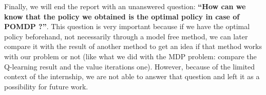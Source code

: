 \documentclass[
  a4paper, xcolor = usenames,dvipsnames]{article}
\theoremstyle{definition}
\theoremstyle{definition}
\theoremstyle{definition}
\theoremstyle{definition}
\theoremstyle{remark}
\begin{document}
Finally, we will end the report with an unanswered question: \textbf{``How can we know that the policy we obtained is the optimal policy in case of POMDP ?''}. This question is very important because if we have the optimal policy beforehand, not necessarily through a model free method, we can later compare it with the result of another method to get an idea if that method works with our problem or not (like what we did with the MDP problem: compare the Q-learning result and the value iterations one). However, because of the limited context of the internship, we are not able to answer that question and left it as a possibility for future work.

\newpage

\printbibliography
\end{document}
